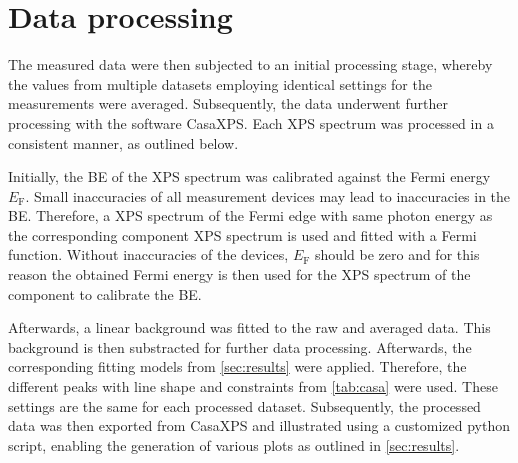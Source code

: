 \section{Data processing}

The measured data were then subjected to an initial processing stage, whereby the values from multiple datasets employing identical settings for the measurements were averaged. Subsequently, the data underwent further processing with the software CasaXPS.\autocite{CasaSoftwareLtd2022} Each XPS spectrum was processed in a consistent manner, as outlined below.

Initially, the \ac{BE} of the \ac{XPS} spectrum was calibrated against the Fermi energy $E_\mathrm{F}$. Small inaccuracies of all measurement devices may lead to inaccuracies in the \ac{BE}. Therefore, a \ac{XPS} spectrum of the Fermi edge with same photon energy as the corresponding component \ac{XPS} spectrum is used and fitted with a Fermi function. Without inaccuracies of the devices, $E_\mathrm{F}$ should be zero and for this reason the obtained Fermi energy is then used for the \ac{XPS} spectrum of the component to calibrate the \ac{BE}.

Afterwards, a linear background was fitted to the raw and averaged data. This background is then substracted for further data processing. Afterwards, the corresponding fitting models from \autoref{sec:results} were applied. Therefore, the different peaks with line shape and constraints from \autoref{tab:casa} were used. These settings are the same for each processed dataset.
Subsequently, the processed data was then exported from CasaXPS and illustrated using a customized python script, enabling the generation of various plots as outlined in \autoref{sec:results}.



